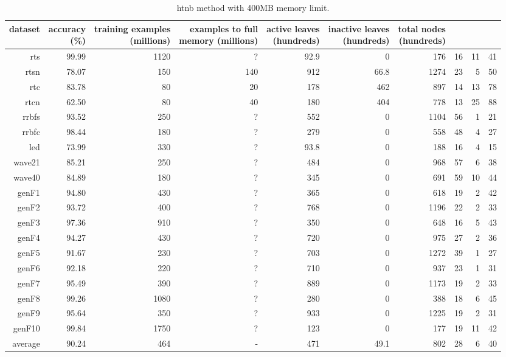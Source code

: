 \clearpage
\begin{table}
\caption{{\sc htnb} method with 400MB memory limit.}
\label{tab:htnb-400MB}
\centering
\begin{tabular}{|r|r|r|r|r|r|r|r|r|r|}
\hline
dataset	&
\rotatebox{90}{\parbox{9em}{accuracy\\(\%)}} &
\rotatebox{90}{\parbox{9em}{training examples\\(millions)}} &
\rotatebox{90}{\parbox{9em}{examples to full\\memory (millions)}} &
\rotatebox{90}{\parbox{9em}{active leaves\\(hundreds)}} &
\rotatebox{90}{\parbox{9em}{inactive leaves\\(hundreds)}} &
\rotatebox{90}{\parbox{9em}{total nodes\\(hundreds)}} &
\rotatebox{90}{\parbox{9em}{tree depth}}	&
\rotatebox{90}{\parbox{9em}{training speed (\%)}} &
\rotatebox{90}{\parbox{9em}{prediction speed (\%)}} \\
\hline
{\sc rts} & 99.99 & 1120 & ? & 92.9 & 0 & 176 & 16 & 11 & 41 \\
{\sc rtsn} & 78.07 & 150 & 140 & 912 & 66.8 & 1274 & 23 & 5 & 50 \\
{\sc rtc} & 83.78 & 80 & 20 & 178 & 462 & 897 & 14 & 13 & 78 \\
{\sc rtcn} & 62.50 & 80 & 40 & 180 & 404 & 778 & 13 & 25 & 88 \\
{\sc rrbfs} & 93.52 & 250 & ? & 552 & 0 & 1104 & 56 & 1 & 21 \\
{\sc rrbfc} & 98.44 & 180 & ? & 279 & 0 & 558 & 48 & 4 & 27 \\
{\sc led} & 73.99 & 330 & ? & 93.8 & 0 & 188 & 16 & 4 & 15 \\
{\sc wave21} & 85.21 & 250 & ? & 484 & 0 & 968 & 57 & 6 & 38 \\
{\sc wave40} & 84.89 & 180 & ? & 345 & 0 & 691 & 59 & 10 & 44 \\
{\sc genF1} & 94.80 & 430 & ? & 365 & 0 & 618 & 19 & 2 & 42 \\
{\sc genF2} & 93.72 & 400 & ? & 768 & 0 & 1196 & 22 & 2 & 33 \\
{\sc genF3} & 97.36 & 910 & ? & 350 & 0 & 648 & 16 & 5 & 43 \\
{\sc genF4} & 94.27 & 430 & ? & 720 & 0 & 975 & 27 & 2 & 36 \\
{\sc genF5} & 91.67 & 230 & ? & 703 & 0 & 1272 & 39 & 1 & 27 \\
{\sc genF6} & 92.18 & 220 & ? & 710 & 0 & 937 & 23 & 1 & 31 \\
{\sc genF7} & 95.49 & 390 & ? & 889 & 0 & 1173 & 19 & 2 & 33 \\
{\sc genF8} & 99.26 & 1080 & ? & 280 & 0 & 388 & 18 & 6 & 45 \\
{\sc genF9} & 95.64 & 350 & ? & 933 & 0 & 1225 & 19 & 2 & 31 \\
{\sc genF10} & 99.84 & 1750 & ? & 123 & 0 & 177 & 19 & 11 & 42 \\
\hline
average & 90.24 & 464 &  -  & 471 & 49.1 & 802 & 28 & 6 & 40 \\
\hline
\end{tabular}
\end{table}
